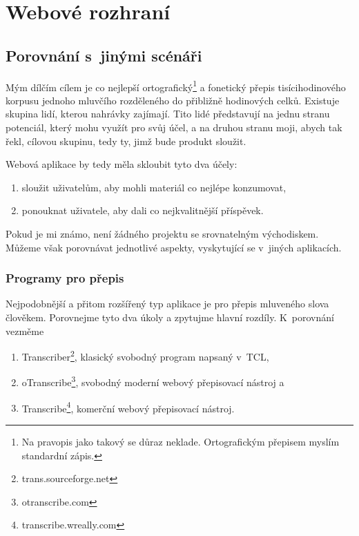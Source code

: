 \chapter{Webové rozhraní}
\label{kap:webove-rozhrani}

\section{Porovnání s~jinými scénáři}

Mým dílčím cílem je co nejlepší ortografický\footnote{Na pravopis jako takový se důraz
neklade. Ortografickým přepisem myslím standardní zápis.} a fonetický přepis
tisícihodinového korpusu jednoho mluvčího rozděleného do přibližně hodinových
celků. Existuje skupina lidí, kterou nahrávky zajímají. Tito lidé představují na
jednu stranu potenciál, který mohu využít pro svůj účel, a na druhou stranu
moji, abych tak řekl, cílovou skupinu, tedy ty, jimž bude produkt sloužit.

Webová aplikace by tedy měla skloubit tyto dva účely:
\begin{enumerate}
\item{sloužit uživatelům, aby mohli  materiál co nejlépe konzumovat,}
\item{ponouknat uživatele, aby dali co nejkvalitnější příspěvek.}
\end{enumerate}

Pokud je mi známo, není žádného projektu se srovnatelným východiskem. Můžeme
však porovnávat jednotlivé aspekty, vyskytující se v~jiných aplikacích.

\subsection{Programy pro přepis}
\label{ssec:diff:trans}

Nejpodobnější a přitom rozšířený typ aplikace je pro přepis mluveného slova
člověkem. Porovnejme tyto dva úkoly a zpytujme hlavní rozdíly. K~porovnání
vezměme
\begin{enumerate}
\item{
    Transcriber\footnote{trans.sourceforge.net}, klasický svobodný program
    napsaný v~TCL,
}
\item{
    oTranscribe\footnote{otranscribe.com}, svobodný moderní webový přepisovací
    nástroj a
}
\item{
    Transcribe\footnote{transcribe.wreally.com}, komerční webový přepisovací
    nástroj.
}
\end{enumerate}

